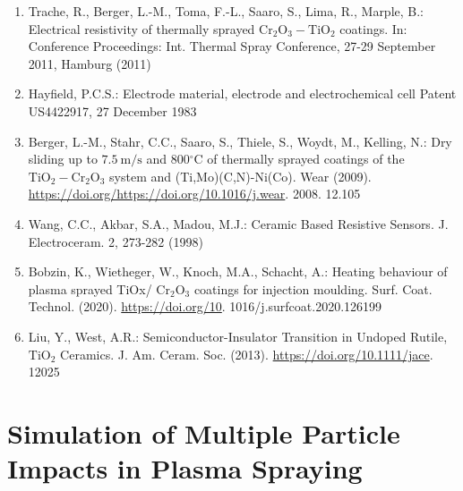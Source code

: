 \documentclass[10pt]{article}
\begin{document}
\begin{enumerate}
  \item Trache, R., Berger, L.-M., Toma, F.-L., Saaro, S., Lima, R., Marple, B.: Electrical resistivity of thermally sprayed $\mathrm{Cr}_{2} \mathrm{O}_{3}-\mathrm{TiO}_{2}$ coatings. In: Conference Proceedings: Int. Thermal Spray Conference, 27-29 September 2011, Hamburg (2011)

  \item Hayfield, P.C.S.: Electrode material, electrode and electrochemical cell Patent US4422917, 27 December 1983

  \item Berger, L.-M., Stahr, C.C., Saaro, S., Thiele, S., Woydt, M., Kelling, N.: Dry sliding up to $7.5 \mathrm{~m} / \mathrm{s}$ and $800{ }^{\circ} \mathrm{C}$ of thermally sprayed coatings of the $\mathrm{TiO}_{2}-\mathrm{Cr}_{2} \mathrm{O}_{3}$ system and (Ti,Mo)(C,N)-Ni(Co). Wear (2009). \href{https://doi.org/https://doi.org/10.1016/j.wear}{https://doi.org/https://doi.org/10.1016/j.wear}. 2008. 12.105

  \item Wang, C.C., Akbar, S.A., Madou, M.J.: Ceramic Based Resistive Sensors. J. Electroceram. 2, 273-282 (1998)

  \item Bobzin, K., Wietheger, W., Knoch, M.A., Schacht, A.: Heating behaviour of plasma sprayed TiOx/ $\mathrm{Cr}_{2} \mathrm{O}_{3}$ coatings for injection moulding. Surf. Coat. Technol. (2020). \href{https://doi.org/10}{https://doi.org/10}. 1016/j.surfcoat.2020.126199

  \item Liu, Y., West, A.R.: Semiconductor-Insulator Transition in Undoped Rutile, $\mathrm{TiO}_{2}$ Ceramics. J. Am. Ceram. Soc. (2013). \href{https://doi.org/10.1111/jace}{https://doi.org/10.1111/jace}. 12025

\end{enumerate}

\section*{Simulation of Multiple Particle Impacts in Plasma Spraying }
\end{document}
